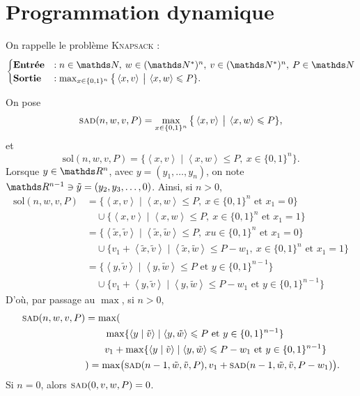 \section{Programmation dynamique}

On rappelle le problème \textsc{Knapsack} : \[
	\begin{cases}
		\text{\textbf{Entrée}} &: n \in \N,\: w \in (\N^*)^n,\: v \in (\N^*)^n,\: P \in \N\\
		\text{\textbf{Sortie}} &:\max_{x \in \{0,1\}^n} \big\{\left<x,v \right> \:\big|\: \left<x,w \right> \le P \}.
	\end{cases}
\]

On pose \[\textsc{sad}(n, w, v, P) = \max_{x \in \{0,1\}^n} \big\{\left<x,v \right> \:\big|\: \left<x,w \right> \le P \},\] et \[\mathrm{sol}(n, w, v, P) = \{\left<x,v \right>  \mid \left<x,w \right> \le P,\: x \in \{0,1\}^n \}.\] Lorsque $y \in \R^n$, avec $y = (y_1, \ldots, y_n)$, on note $\R^{n-1} \owns \tilde y = (y_2, y_3, \ldots, 0)$. Ainsi, si $n > 0$,
\begin{align*}
	\mathrm{sol}(n, w, v, P) &= \{\left<x, v \right>  \mid \left< x,w \right> \le P,\: x \in \{0,1\}^n \text{ et } x_1 = 0\}\\
	&\quad\cup \{\left<x, v \right>  \mid \left< x,w \right> \le P,\: x \in \{0,1\}^n \text{ et } x_1 = 1\}\\
	&= \{\left<\tilde{x}, \tilde{v} \right>  \mid \left<\tilde{x}, \tilde{w} \right> \le P,\: x u\in \{0,1\}^n \text{ et } x_1 = 0\} \\
	&\quad\cup \{v_1 + \left<\tilde{x}, \tilde{v} \right>  \mid \left<\tilde{x},\tilde{w} \right> \le P - w_1,\: x \in \{0,1\}^n \text{ et } x_1 = 1\}\\
	&= \{\left<y, \tilde{v} \right>  \mid \left<y, \tilde{w} \right> \le P \text{ et } y \in \{0,1\}^{n-1}\}  \\
	&\quad\cup \{v_1 + \left<y, \tilde{v} \right>  \mid \left<y, \tilde{w} \right> \le P - w_1 \text{ et } y \in \{0,1\}^{n-1}\}
\end{align*}
D'où, par passage au $\max$, si $n > 0$,
\begin{align*}
	\textsc{sad}(n, w, v, P) &= \max( \\
	&\quad\quad \max \{\left<y  \mid \tilde{v} \right>  \mid \left<y, \tilde{w} \right> \le P \text{ et } y \in \{0,1\}^{n-1}\}\\
	&\quad\quad v_1 + \max \{\left<y  \mid \tilde{v} \right>  \mid \left<y, \tilde{w} \right> \le P - w_1 \text{ et } y \in \{0,1\}^{n-1}\} \\
	&) = \max\!\big(\textsc{sad}(n-1, \tilde{w}, \tilde{v}, P), v_1 + \textsc{sad}(n-1, \tilde{w}, \tilde{v}, P - w_1)\big).
\end{align*}
Si $n = 0$, alors $\textsc{sad}(0, v, w, P) = 0$.


